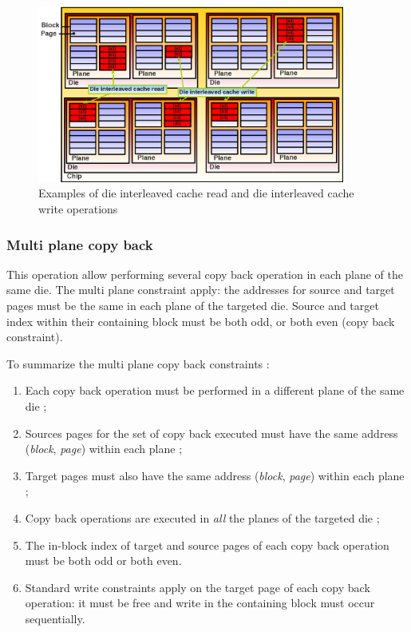 \begin{figure}
  \center
  \includegraphics[width=0.9\textwidth]{Includes/DieInterleavedCacheOp}
  \caption{Examples of die interleaved cache read and die interleaved cache write operations}
  \label{fig:dieinterleavedcacheop}
\end{figure}

\subsubsection{Multi plane copy back}
This operation allow performing several copy back operation in each plane of the same die. The multi plane constraint apply: the addresses for source and target pages must be the same in each plane of the targeted die. Source and target index within their containing block must be both odd, or both even (copy back constraint).

To summarize the multi plane copy back constraints :

\begin{enumerate}
  \item Each copy back operation must be performed in a different plane of the same die ;
  \item Sources pages for the set of copy back executed must have the same address (\emph{block}, \emph{page}) within each plane ; 
  \item Target pages must also have the same address (\emph{block}, \emph{page}) within each plane ;
  \item Copy back operations are executed in \emph{all} the planes of the targeted die ;
  \item The in-block index of target and source pages of each copy back operation must be both odd or both even.
  \item Standard write constraints apply on the target page of each copy back operation: it must be free and write in the containing block must occur sequentially.
\end{enumerate}

